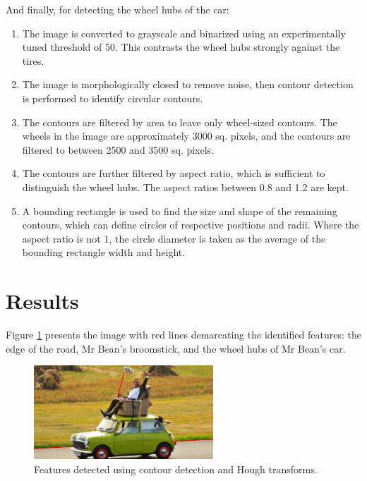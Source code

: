 And finally, for detecting the wheel hubs of the car:
\begin{enumerate}
  \item The image is converted to grayscale and binarized using an experimentally tuned threshold of 50. This contrasts the wheel hubs strongly against the tires.

  \item The image is morphologically closed to remove noise, then contour detection is performed to identify circular contours.

  \item The contours are filtered by area to leave only wheel-sized contours. The wheels in the image are approximately 3000 sq. pixels, and the contours are filtered to between 2500 and 3500 sq. pixels.

  \item The contours are further filtered by aspect ratio, which is sufficient to distinguish the wheel hubs. The aspect ratios between 0.8 and 1.2 are kept.

  \item A bounding rectangle is used to find the size and shape of the remaining contours, which can define circles of respective positions and radii. Where the aspect ratio is not 1, the circle diameter is taken as the average of the bounding rectangle width and height.

\end{enumerate}

\section{Results}

Figure \ref{fig:q3results} presents the image with red lines demarcating the identified features: the edge of the road, Mr Bean's broomstick, and the wheel hubs of Mr Bean's car.

\begin{figure}[ht]
  \centering
  \includegraphics[width=0.6\textwidth]{images/q3_results.png}
  \caption{Features detected using contour detection and Hough transforms.}
  \label{fig:q3results}
\end{figure}

